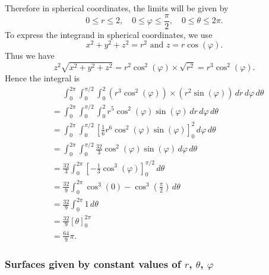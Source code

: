 \begin{example}
    Therefore in spherical coordinates, the limits will be given by
      \[
        0 \leq r \leq 2, \quad 0 \leq \varphi \leq \frac{\pi}{2}, \quad 0 \leq \theta \leq 2\pi.
      \]
    To express the integrand in spherical coordinates, we use
      \[
        x^2 + y^2 + z^2 = r^2 \text{ and } z = r\cos(\varphi).
      \]
    Thus we have
      \[
        z^2\sqrt{x^2 + y^2 + z^2} = r^2\cos^2(\varphi) \times \sqrt{r^2} = r^3\cos^2(\varphi).
      \]
    Hence the integral is
      \begin{align*}
        & \phantom{=} \int\nolimits_0^{2\pi} \int\nolimits_0^{\pi/2} \int\nolimits_0^2 \left(r^3\cos^2(\varphi)\right) \times \left(r^2\sin(\varphi)\right) \, dr \, d\varphi \, d\theta  \\
        & = \int\nolimits_0^{2\pi} \int\nolimits_0^{\pi/2} \int\nolimits_0^2 r^5\cos^2(\varphi)\sin(\varphi) \, dr \, d\varphi \, d\theta  \\
        & = \int\nolimits_0^{2\pi} \int\nolimits_0^{\pi/2} \left[\frac{1}{6}r^6\cos^2(\varphi)\sin(\varphi)\right]_0^2 \, d\varphi \, d\theta  \\
        & = \int\nolimits_0^{2\pi} \int\nolimits_0^{\pi/2} \frac{32}{3}\cos^2(\varphi)\sin(\varphi) \, d\varphi \, d\theta  \\
        & = \frac{32}{3} \int\nolimits_0^{2\pi} \left[-\frac{1}{3}\cos^3(\varphi)\right]_0^{\pi/2} \, d\theta  \\
        & = \frac{32}{9} \int\nolimits_0^{2\pi} \cos^3(0) - \cos^3\left(\frac{\pi}{2}\right) \, d\theta  \\
        & = \frac{32}{9} \int\nolimits_0^{2\pi} 1 \, d\theta  \\
        & = \frac{32}{9}\left[\theta\right]_0^{2\pi}  \\
        & = \frac{64}{9}\pi.
      \end{align*}
  \end{example}
  
  \subsubsection*{Surfaces given by constant values of $r$, $\theta$, $\varphi$}
  
